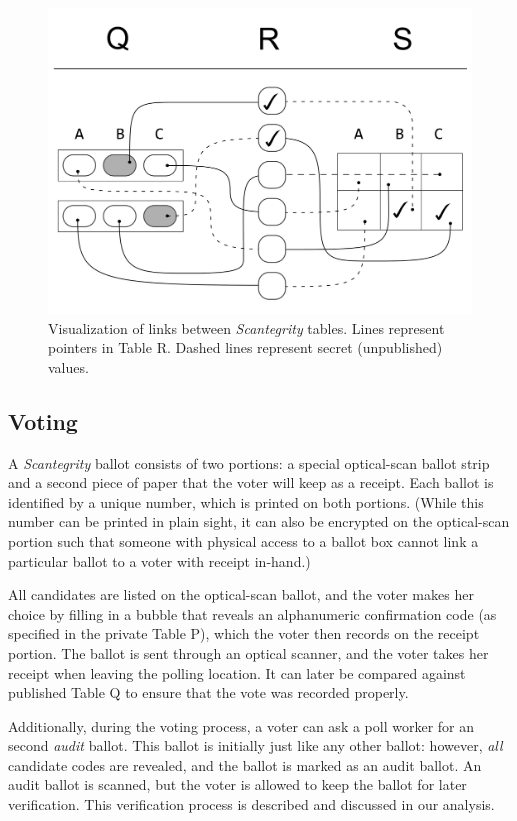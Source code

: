 \documentclass[10pt,twocolumn]{article}
\newcommand{\term}[1]{\textit{#1}}
\begin{document}
\begin{figure}
	\center
	\includegraphics[width=\columnwidth]{images/include/scantegrity.pdf}
	\caption{
		Visualization of links between \term{Scantegrity} tables.
		Lines represent pointers in Table R.
		Dashed lines represent secret (unpublished) values.
	}
	\label{fig:scantegrity}
\end{figure}

\subsection{Voting}

A \term{Scantegrity} ballot consists of two portions: a special optical-scan ballot strip and a second
piece of paper that the voter will keep as a receipt. Each ballot is identified by a unique number,
which is printed on both portions. (While this number can be printed in plain sight, it can also be
encrypted on the optical-scan portion such that someone with physical access to a ballot box cannot
link a particular ballot to a voter with receipt in-hand.)

All candidates are listed on the optical-scan ballot, and the voter makes her choice by filling
in a bubble that reveals an alphanumeric confirmation code (as specified in the private Table
P), which the voter then records on the receipt portion. The ballot is sent through an optical
scanner, and the voter takes her receipt when leaving the polling location. It can later be
compared against published Table Q to ensure that the vote was recorded properly.

Additionally, during the voting process, a voter can ask a poll worker for an second \term{audit}
ballot. This ballot is initially just like any other ballot: however, \emph{all} candidate codes are
revealed, and the ballot is marked as an audit ballot. An audit ballot is scanned, but the voter is
allowed to keep the ballot for later verification. This verification process is described and
discussed in our analysis.
\end{document}
